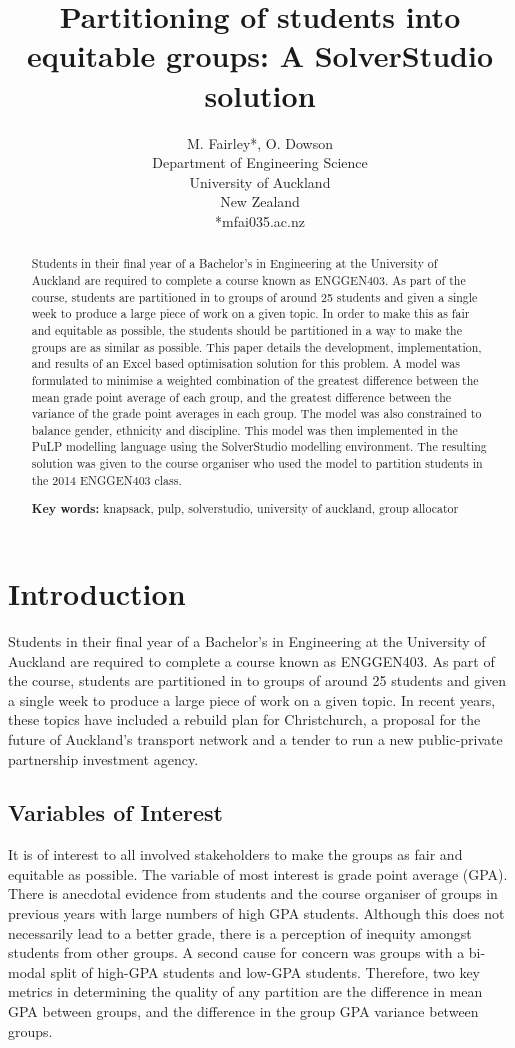 \documentclass[12pt]{ORSNZ}
\title{Partitioning of students into equitable groups: A SolverStudio solution}
\author{M. Fairley*, O. Dowson\\Department of Engineering Science\\University of
  Auckland\\New Zealand\\{*}mfai035\@@aucklanduni.ac.nz}
\date{} %
\begin{document}
\maketitle
\pagestyle{empty} \thispagestyle{empty}
\begin{abstract}
Students in their final year of a Bachelor’s in Engineering at the University of Auckland are required to complete a course known as ENGGEN403. As part of the course, students are partitioned in to groups of around 25 students and given a single week to produce a large piece of work on a given topic. In order to make this as fair and equitable as possible, the students should be partitioned in a way to make the groups are as similar as possible. This paper details the development, implementation, and results of an Excel based optimisation solution for this problem. A model was formulated to minimise a weighted combination of the greatest difference between the mean grade point average of each group, and the greatest difference between the variance of the grade point averages in each group. The model was also constrained to balance gender, ethnicity and discipline. This model was then implemented in the PuLP modelling language using the SolverStudio modelling environment. The resulting solution was given to the course organiser who used the model to partition students in the 2014 ENGGEN403 class.

\textbf{Key words:} knapsack, pulp, solverstudio, university of auckland, group allocator
\end{abstract}

\section{Introduction}
Students in their final year of a Bachelor’s in Engineering at the University of Auckland are required to complete a course known as ENGGEN403. As part of the course, students are partitioned in to groups of around 25 students and given a single week to produce a large piece of work on a given topic. In recent years, these topics have included a rebuild plan for Christchurch, a proposal for the future of Auckland’s transport network and a tender to run a new public-private partnership investment agency.

\subsection{Variables of Interest}
It is of interest to all involved stakeholders to make the groups as fair and equitable as possible. The variable of most interest is grade point average (GPA). There is anecdotal evidence from students and the course organiser of groups in previous years with large numbers of high GPA students. Although this does not necessarily lead to a better grade, there is a perception of inequity amongst students from other groups. A second cause for concern was groups with a bi-modal split of high-GPA students and low-GPA students. Therefore, two key metrics in determining the quality of any partition are the difference in mean GPA between groups, and the difference in the group GPA variance between groups.
\end{document}
